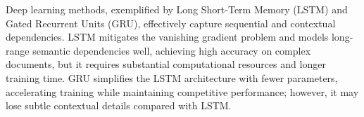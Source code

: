 \documentclass{article}
\begin{document}
Deep learning methods, exemplified by Long Short-Term Memory (LSTM) and Gated Recurrent Units (GRU), effectively capture sequential and contextual dependencies. LSTM mitigates the vanishing gradient problem and models long-range semantic dependencies well, achieving high accuracy on complex documents, but it requires substantial computational resources and longer training time. GRU simplifies the LSTM architecture with fewer parameters, accelerating training while maintaining competitive performance; however, it may lose subtle contextual details compared with LSTM.



\end{document}
